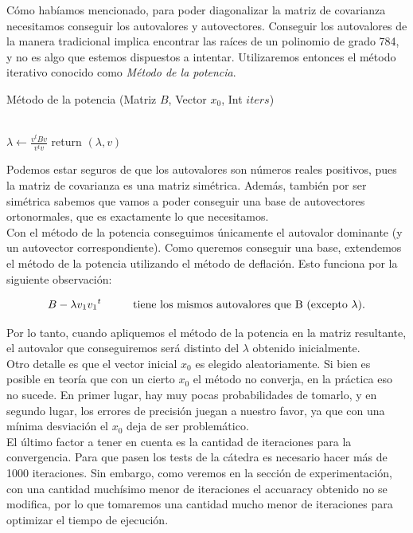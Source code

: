 Cómo habíamos mencionado, para poder diagonalizar la matriz de covarianza necesitamos conseguir los autovalores y autovectores. Conseguir los autovalores de la manera tradicional implica encontrar las raíces de un polinomio de grado 784, y no es algo que estemos dispuestos a intentar. Utilizaremos entonces el método iterativo conocido como \textit{Método de la potencia}.
\begin{algorithm}
    \caption{Método de la potencia (Matriz $B$, Vector $x_0$, Int $iters$)}
    \begin{algorithmic}[h]
             \\
        \EndFor
        \State  $\lambda \gets \frac{v^tBv}{v^tv}$
        \State return $(\lambda, v)$

    \end{algorithmic}
\end{algorithm}

Podemos estar seguros de que los autovalores son números reales positivos, pues la matriz de covarianza es una matriz simétrica. Además, también por ser simétrica sabemos que vamos a poder conseguir una base de autovectores ortonormales, que es exactamente lo que necesitamos. \\

Con el método de la potencia conseguimos únicamente el autovalor dominante (y un autovector correspondiente). Como queremos conseguir una base, extendemos el método de la potencia utilizando el método de deflación. Esto funciona por la siguiente observación:

$$ B - \lambda v_1 {v_1}^{t} \text{\hspace{1cm}tiene los mismos autovalores que B (excepto $\lambda$).} $$

Por lo tanto, cuando apliquemos el método de la potencia en la matriz resultante, el autovalor que conseguiremos será distinto del $\lambda$ obtenido inicialmente. \\

Otro detalle es que el vector inicial $x_0$ es elegido aleatoriamente. Si bien es posible en teoría que con un cierto $x_0$ el método no converja, en la práctica eso no sucede. En primer lugar, hay muy pocas probabilidades de tomarlo, y en segundo lugar, los errores de precisión juegan a nuestro favor, ya que con una mínima desviación el $x_0$ deja de ser problemático. \\

El último factor a tener en cuenta es la cantidad de iteraciones para la convergencia. Para que pasen los tests de la cátedra es necesario hacer más de 1000 iteraciones. Sin embargo, como veremos en la sección de experimentación, con una cantidad muchísimo menor de iteraciones el accuaracy obtenido no se modifica, por lo que tomaremos una cantidad mucho menor de iteraciones para optimizar el tiempo de ejecución. \\

